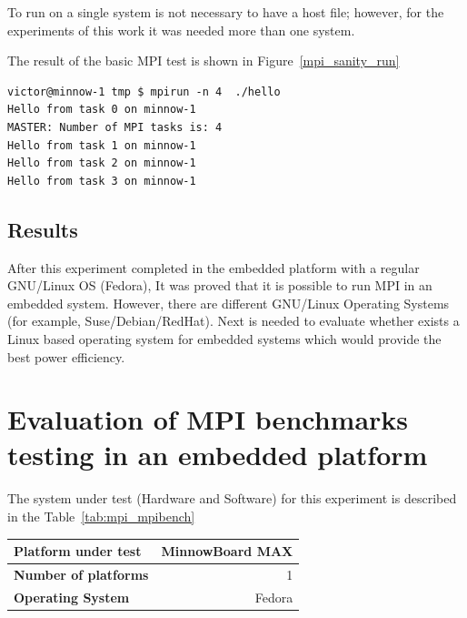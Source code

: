 To run on a single system is not necessary to have a host file; however, for
the experiments of this work it was needed more than one system.

The result of the basic MPI test is shown in Figure~\ref{mpi_sanity_run}

\begin{minipage}{\textwidth}
\end{minipage}

\begin{minipage}{\textwidth}
\begin{lstlisting}[frame=single]
victor@minnow-1 tmp $ mpirun -n 4  ./hello
Hello from task 0 on minnow-1
MASTER: Number of MPI tasks is: 4
Hello from task 1 on minnow-1
Hello from task 2 on minnow-1
Hello from task 3 on minnow-1
\end{lstlisting}
\label{mpi_sanity_run}
\end{minipage}

\subsection{Results}

After this experiment completed in the embedded platform with a regular GNU/Linux
OS (Fedora), It was proved that it is possible to run MPI in an embedded
system. However, there are different GNU/Linux Operating Systems
(for example, Suse/Debian/RedHat). Next is needed to evaluate whether exists a
Linux based operating system for embedded systems which would provide the best
power efficiency. 

\section{Evaluation of MPI benchmarks testing in an embedded platform}
    
The system under test (Hardware and Software) for this experiment is described
in the Table~\ref{tab:mpi_mpibench}

    \begin{center}
    \begin{tabular}{ | l | r |}
        \hline
        \textbf{Platform under test} &  MinnowBoard MAX \\ \hline
        \textbf{Number of platforms}  & 1  \\ \hline
        \textbf{Operating System} & Fedora  \\ \hline
    \end{tabular}
    \label{tab:mpi_mpibench}
    \end{center}

